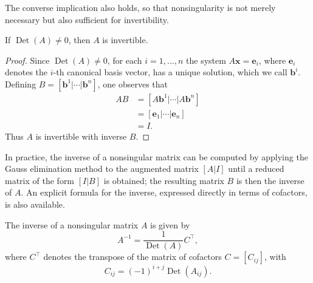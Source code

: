 The converse implication also holds, so that nonsingularity is not merely necessary but also sufficient for invertibility.

\begin{theorem}
If $\operatorname{Det}(A) \neq 0$, then $A$ is invertible.
\end{theorem}

\begin{proof}
Since $\operatorname{Det}(A) \neq 0$, for each $i = 1, \dots, n$ the system $A\mathbf{x} = \mathbf{e}_i$, where $\mathbf{e}_i$ denotes the $i$-th canonical basis vector, has a unique solution, which we call $\mathbf{b}^i$. Defining $B = [\mathbf{b}^1 | \cdots | \mathbf{b}^n]$, one observes that
\[
\begin{aligned}
AB &= [A\mathbf{b}^1 | \cdots | A\mathbf{b}^n] \\
&= [\mathbf{e}_1 | \cdots | \mathbf{e}_n] \\
&= I.
\end{aligned}
\]
Thus $A$ is invertible with inverse $B$.
\end{proof}

In practice, the inverse of a nonsingular matrix can be computed by applying the Gauss elimination method to the augmented matrix $[A | I]$ until a reduced matrix of the form $[I | B]$ is obtained; the resulting matrix $B$ is then the inverse of $A$. An explicit formula for the inverse, expressed directly in terms of cofactors, is also available.

\begin{theorem}
The inverse of a nonsingular matrix $A$ is given by
\[
A^{-1} = \frac{1}{\operatorname{Det}(A)} C^{\top},
\] where $C^{\top}$ denotes the transpose of the matrix of cofactors $C = [C_{ij}]$, with
\[
C_{ij} = (-1)^{i+j} \operatorname{Det}(A_{ij}).
\]

\end{theorem}

